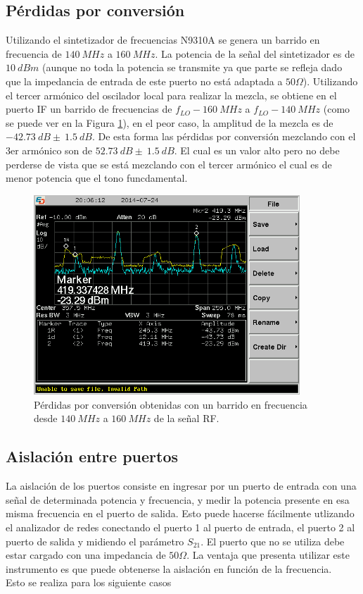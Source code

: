 \documentclass[a4paper,10pt]{article}
\begin{document}
	\subsection{P\'erdidas por conversi\'on}
	\indent Utilizando el sintetizador de frecuencias N9310A se genera un 
	barrido en frecuencia de $140~MHz$ a $160~MHz$. La potencia de la se\~nal 
	del sintetizador es de $10~dBm$ (aunque no toda la potencia se transmite ya 
	que parte se refleja dado que la impedancia de entrada de este puerto no 
	est\'a adaptada a $50\Omega$). Utilizando el tercer arm\'onico del oscilador
	local para realizar la mezcla, se obtiene en el puerto IF un barrido de 
	frecuencias de $f_{LO}-160~MHz$ a $f_{LO}-140~MHz$ (como se puede ver en la 
	Figura \ref{perdidas}), en el peor caso, la amplitud de la mezcla es de 
	$-42.73~dB\pm~1.5~dB$. De esta forma las p\'erdidas por conversi\'on 
	mezclando con el 3er arm\'onico son de $52.73~dB\pm~1.5~dB$. El cual es un 
	valor alto pero no debe perderse de vista que se est\'a mezclando con el 
	tercer arm\'onico el cual es de menor potencia que el tono funcdamental.
	
	\begin{figure}[!htb]
		\centering
		\includegraphics[width=10cm]{Images/SCREN538.png}
		\caption{P\'erdidas por conversi\'on obtenidas con un barrido en 
		frecuencia desde $140~MHz$ a $160~MHz$ de la se\~nal RF.}
		\label{perdidas}
	\end{figure}	
	
	\subsection{Aislación entre puertos}
	\indent La aislaci\'on de los puertos consiste en ingresar por un puerto de 
	entrada con una se\~nal de determinada potencia y frecuencia, y medir la 
	potencia presente en esa misma frecuencia en el puerto de salida. Esto puede
	hacerse f\'acilmente utlizando el analizador de redes conectando el puerto 1 
	al puerto de entrada, el puerto 2 al puerto de salida y midiendo el 
	par\'ametro $S_{21}$. El puerto que no se utiliza debe estar cargado con una
	impedancia de $50\Omega$. La ventaja que presenta utilizar este instrumento 
	es que puede obtenerse la aislaci\'on en funci\'on de la frecuencia. \\
	\indent Esto se realiza para los siguiente casos
	
\end{document}
